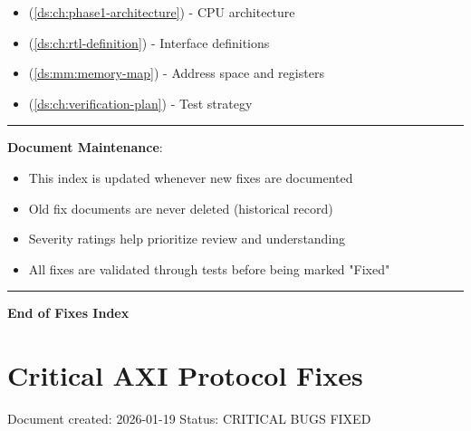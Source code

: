 \begin{record}

\begin{itemize}
\tightlist
\item
   (\cref{ds:ch:phase1-architecture}) - CPU architecture
\item
   (\cref{ds:ch:rtl-definition}) - Interface definitions
\item
   (\cref{ds:mm:memory-map}) - Address space and registers
\item
   (\cref{ds:ch:verification-plan}) - Test strategy
\end{itemize}

\begin{center}\rule{0.5\linewidth}{0.5pt}\end{center}

\textbf{Document Maintenance}:

\begin{itemize}
\tightlist
\item
  This index is updated whenever new fixes are documented
\item
  Old fix documents are never deleted (historical record)
\item
  Severity ratings help prioritize review and understanding
\item
  All fixes are validated through tests before being marked "Fixed"
\end{itemize}

\begin{center}\rule{0.5\linewidth}{0.5pt}\end{center}

\textbf{End of Fixes Index}

\end{record}

\section{Critical AXI Protocol Fixes}\label{cr:fix:critical-fixes}

\begin{record}

Document created: 2026-01-19 Status: CRITICAL BUGS FIXED

\end{record}

